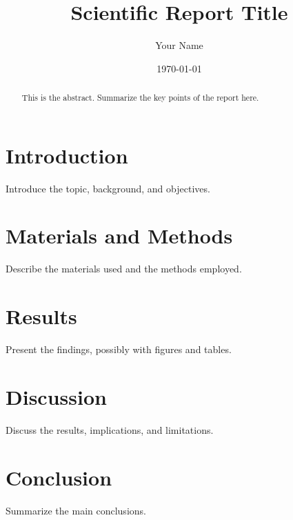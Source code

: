 \documentclass[12pt,a4paper]{article}
\title{Scientific Report Title}
\author{Your Name}
\date{\today}
\begin{document}
\maketitle

\begin{abstract}
This is the abstract. Summarize the key points of the report here.
\end{abstract}

\section{Introduction}
Introduce the topic, background, and objectives.

\section{Materials and Methods}
Describe the materials used and the methods employed.

\section{Results}
Present the findings, possibly with figures and tables.

\section{Discussion}
Discuss the results, implications, and limitations.

\section{Conclusion}
Summarize the main conclusions.



\end{document}
